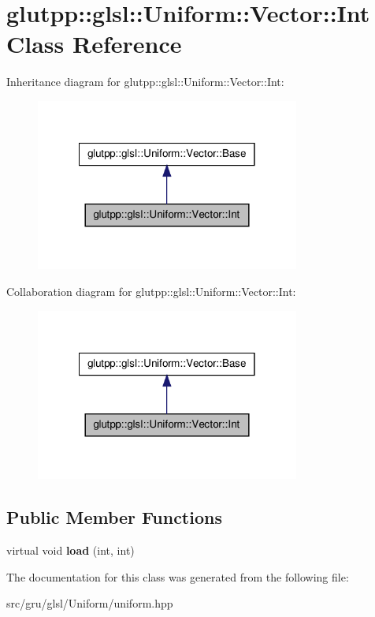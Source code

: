 \hypertarget{classglutpp_1_1glsl_1_1Uniform_1_1Vector_1_1Int}{\section{glutpp\-:\-:glsl\-:\-:\-Uniform\-:\-:\-Vector\-:\-:\-Int \-Class \-Reference}
\label{classglutpp_1_1glsl_1_1Uniform_1_1Vector_1_1Int}
}


\-Inheritance diagram for glutpp\-:\-:glsl\-:\-:\-Uniform\-:\-:\-Vector\-:\-:\-Int\-:
\nopagebreak
\begin{figure}[H]
\begin{center}
\leavevmode
\includegraphics[width=246pt]{classglutpp_1_1glsl_1_1Uniform_1_1Vector_1_1Int__inherit__graph}
\end{center}
\end{figure}


\-Collaboration diagram for glutpp\-:\-:glsl\-:\-:\-Uniform\-:\-:\-Vector\-:\-:\-Int\-:
\nopagebreak
\begin{figure}[H]
\begin{center}
\leavevmode
\includegraphics[width=246pt]{classglutpp_1_1glsl_1_1Uniform_1_1Vector_1_1Int__coll__graph}
\end{center}
\end{figure}
\subsection*{\-Public \-Member \-Functions}
\begin{DoxyCompactItemize}
\item 
\hypertarget{classglutpp_1_1glsl_1_1Uniform_1_1Vector_1_1Int_aa7e69bdb3e0ec1b95093fc15fa327e7e}{virtual void {\bfseries load} (int, int)}\label{classglutpp_1_1glsl_1_1Uniform_1_1Vector_1_1Int_aa7e69bdb3e0ec1b95093fc15fa327e7e}

\end{DoxyCompactItemize}


\-The documentation for this class was generated from the following file\-:\begin{DoxyCompactItemize}
\item 
src/gru/glsl/\-Uniform/uniform.\-hpp\end{DoxyCompactItemize}
